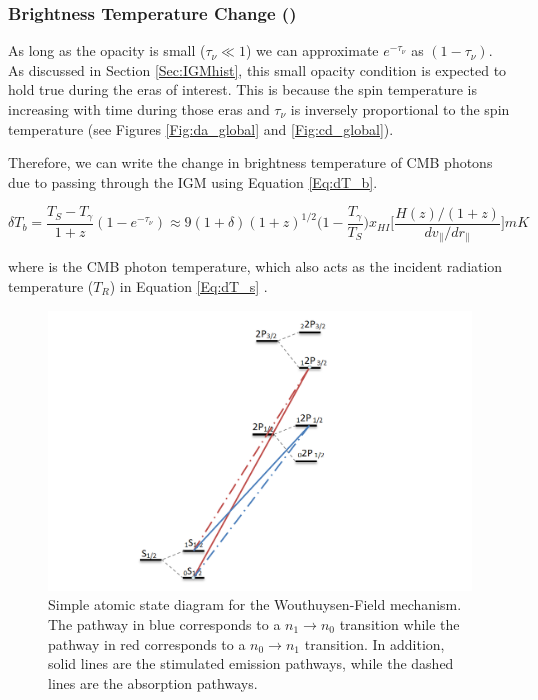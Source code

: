 \subsubsection{Brightness Temperature Change (\dtb)}
As long as the opacity is small ($\tau_\nu \ll 1$) we can approximate $e^{-\tau_\nu}$ as $(1-\tau_\nu)$. As discussed in Section \ref{Sec:IGMhist}, this small opacity condition is expected to hold true during the eras of interest. This is because the spin temperature is increasing with time during those eras and $\tau_\nu$ is inversely proportional to the spin temperature (see Figures \ref{Fig:da_global} and \ref{Fig:cd_global}).

Therefore, we can write the change in brightness temperature of CMB photons due to passing through the IGM using Equation \ref{Eq:dT_b}.

\begin{equation}\label{Eq:dT_b}
\delta T_b = \frac{T_S - T_\gamma}{1+z}(1-e^{-\tau_\nu}) \approx 9 (1+\delta) (1+z)^{1/2} \Big(1-\frac{T_\gamma}{T_S}\Big) x_{HI} \Big[ \frac{H(z)/(1+z)}{dv_{\parallel}/dr_{\parallel}} \Big] mK
\end{equation}

where \tg is the CMB photon temperature, which also acts as the incident radiation temperature ($T_R$) in Equation \ref{Eq:dT_s} \cite{furlanetto_2006}. 


\begin{figure}[htb]
\begin{center}
\includegraphics[width=0.95\linewidth]{Introduction/figures/wfm_states.png}
\caption{Simple atomic state diagram for the Wouthuysen-Field mechanism. The pathway in blue corresponds to a $n_1 \rightarrow n_0$ transition while the pathway in red corresponds to a $n_0 \rightarrow n_1$ transition. In addition, solid lines are the stimulated emission pathways, while the dashed lines are the absorption pathways.}
\label{Fig:wfm_states}
\end{center}
\end{figure}

